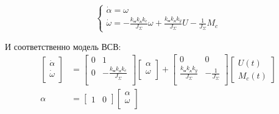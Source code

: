 \documentclass[a4paper, 12pt]{article}
\begin{document}
\begin{equation}
    \begin{cases}
    \dot{\alpha} = \omega \\
    \dot{\omega} = -\frac{k_\text{м}k_\text{д}k_e}{J_\Sigma}\omega + \frac{k_\text{м}k_\text{д}k_y}{J_\Sigma}U - \frac{1}{J_\Sigma}M_c
    \end{cases}
\end{equation}

И соответственно модель ВСВ: 
\begin{align}
    \begin{bmatrix}
        \dot{\alpha} \\
        \dot{\omega} \\
    \end{bmatrix} & = 
    \begin{bmatrix}
        0 & 1 \\
        0 & -\frac{k_\text{м}k_\text{д}k_e}{J_\Sigma} \\
    \end{bmatrix}
    \begin{bmatrix}
        \alpha \\
        \omega \\
    \end{bmatrix} + 
    \begin{bmatrix}
        0 & 0 \\
        \frac{k_\text{м}k_\text{д}k_y}{J_\Sigma} & -\frac{1}{J_\Sigma} \\
    \end{bmatrix}
    \begin{bmatrix}
        U(t) \\
        M_c(t)
    \end{bmatrix} \\
    \alpha & = 
    \begin{bmatrix}
        1 & 0 
    \end{bmatrix}
    \begin{bmatrix}
        \alpha \\
        \omega \\
    \end{bmatrix}
\end{align}
\end{document}
